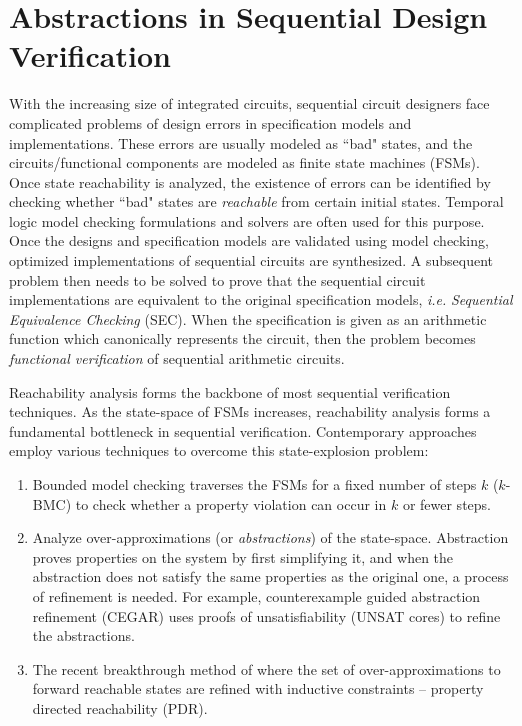 \section{Abstractions in Sequential Design Verification}
With the increasing size of integrated
circuits, sequential circuit designers face complicated problems of
design errors in specification models and implementations. These
errors are usually modeled as ``bad" states, and the
circuits/functional components are modeled as finite state machines
(FSMs). Once state reachability is analyzed, the existence of errors
can be identified by checking whether ``bad" states are {\it
  reachable} from certain initial states. Temporal logic model
  checking formulations and solvers are often used for this
purpose. Once the designs and specification models are validated using
model checking, optimized implementations of sequential circuits are
synthesized. A subsequent problem then needs to be solved to prove
that the sequential circuit implementations are equivalent to the
original specification models, {\it i.e.} {\it Sequential Equivalence
  Checking }(SEC). When the specification is given as an arithmetic function
which canonically represents the circuit, then the problem 
becomes {\it functional verification} of sequential arithmetic circuits.

Reachability analysis forms the backbone of most sequential
verification techniques. As the state-space of FSMs increases,
reachability analysis forms a fundamental bottleneck in sequential
verification. Contemporary approaches employ various techniques to
overcome this state-explosion problem: 

\begin{enumerate}[{1)}]
\item Bounded model checking
\cite{bitlevel1} traverses the FSMs for a fixed number of steps $k$
($k$-BMC) to check whether a property violation can occur in $k$ or
fewer steps.  
\item Analyze over-approximations (or {\it abstractions})
of the state-space. Abstraction proves properties on the system by
first simplifying it, and when the abstraction does not satisfy the
same properties as the original one, a process of refinement is
needed. For example, counterexample guided
abstraction refinement (CEGAR) \cite{cegar-journal} uses proofs of
unsatisfiability (UNSAT cores) to refine the abstractions.
\item The recent breakthrough method of \cite{bradley2011sat} where the set of
over-approximations to forward reachable states are refined with
inductive constraints -- property directed reachability (PDR). 
\end{enumerate}

